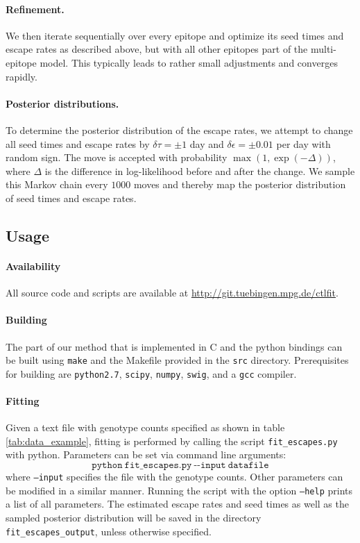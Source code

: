 \documentclass{frontiers}
\newcommand{\fcoeff}{\epsilon}
\begin{document}
\paragraph*{Refinement.}
We then iterate sequentially over every epitope and optimize its seed times and
escape rates as described above, but with all other epitopes part of the
multi-epitope model. This typically leads to rather small adjustments and
converges rapidly.

\paragraph*{Posterior distributions.}
To determine the posterior distribution of the escape rates, we attempt to
change all seed times and escape rates by $\delta \tau = \pm 1$ day and $\delta
\fcoeff = \pm 0.01$ per day with random sign. The move is accepted with
probability $\max(1,\exp(-\Delta))$, where $\Delta$ is the difference in
log-likelihood before and after the change. We sample this Markov chain every
$1000$ moves and thereby map the posterior distribution of seed times and escape
rates.

\subsection{Usage}
\paragraph*{Availability}
All source code and scripts are available at
\url{http://git.tuebingen.mpg.de/ctlfit}. 

\paragraph*{Building}
The part of our method that is implemented in C and the python
bindings can be built using \texttt{make} and the Makefile provided in
the \texttt{src} directory. Prerequisites for building are
\texttt{python2.7}, \texttt{scipy}, \texttt{numpy}, \texttt{swig}, and
a \texttt{gcc} compiler. 

\paragraph*{Fitting}
Given a text file with genotype counts specified as shown in table
\ref{tab:data_example}, fitting is performed by calling the script
\texttt{fit\_escapes.py} with python. Parameters can be set via
command line arguments:
\begin{equation}
  \label{eq:command}
  \mathtt{python\ fit\_escapes.py\ \mbox{-}\mbox{-}input\ datafile}
\end{equation}
where \texttt{--input} specifies the file with the genotype
counts. Other parameters can be modified in a similar manner. Running
the script with the option \texttt{--help} prints a list of all parameters. The estimated
escape rates and seed times as well as the sampled posterior
distribution will be saved in the directory
\texttt{fit\_escapes\_output}, unless otherwise specified.
\end{document}
